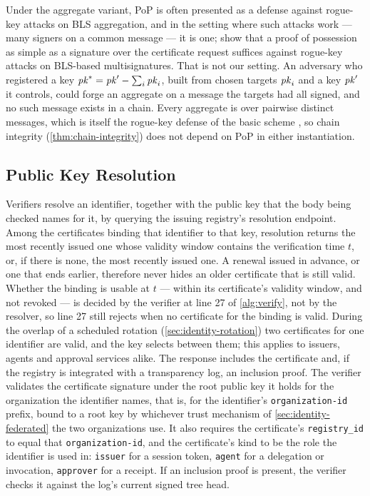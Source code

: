 \documentclass[11pt,a4paper]{article}
\begin{document}
Under the aggregate variant, PoP is often presented as a defense against
rogue-key attacks on BLS aggregation, and in the setting where such
attacks work --- many signers on a common message --- it is one;
\citet{ristenpart2007pop} show that a proof of possession as simple as a
signature over the certificate request suffices against rogue-key
attacks on BLS-based multisignatures. That is not our setting. An
adversary who registered a key $\mathit{pk}^* = \mathit{pk}' - \sum_i \mathit{pk}_i$, built from
chosen targets $\mathit{pk}_i$ and a key $\mathit{pk}'$ it controls, could forge an
aggregate on a message the targets had all signed, and no such message
exists in a chain. Every aggregate is over pairwise distinct messages,
which is itself the rogue-key defense of the basic scheme
\citep{bgls2003aggregate,ietf-bls-signature}, so chain integrity
(\cref{thm:chain-integrity}) does not depend on PoP in either
instantiation.

\subsection{Public Key Resolution}
\label{sec:identity-resolution}

Verifiers resolve an identifier, together with the public key that the
body being checked names for it, by querying the issuing registry's
resolution endpoint. Among the certificates binding that identifier to
that key, resolution returns the most recently issued one whose validity
window contains the verification time $t$, or, if there is none, the
most recently issued one. A renewal issued in advance, or one that ends
earlier, therefore never hides an older certificate that is still valid.
Whether the binding is usable at $t$ --- within its certificate's
validity window, and not revoked --- is decided by the verifier at
line 27 of \cref{alg:verify}, not by the resolver, so line 27 still
rejects when no certificate for the binding is valid. During the overlap of a scheduled rotation
(\cref{sec:identity-rotation}) two certificates for one identifier are
valid, and the key selects between them; this applies to issuers,
agents and approval services alike. The response includes the certificate
and, if the registry is integrated with a transparency log, an
inclusion proof. The verifier validates the certificate signature under
the root public key it holds for the organization the identifier names,
that is, for the identifier's \texttt{organization-id} prefix, bound to
a root key by whichever trust mechanism of \cref{sec:identity-federated}
the two organizations use. It also requires the certificate's
\texttt{registry\_id} to equal that \texttt{organization-id}, and the
certificate's kind to be the role the identifier is used in:
\texttt{issuer} for a session token, \texttt{agent} for a delegation or
invocation, \texttt{approver} for a receipt. If an
inclusion proof is present, the verifier checks it against the log's
current signed tree head.
\end{document}
